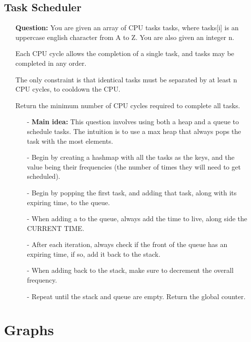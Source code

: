 \documentclass[12pt]{article}
\begin{document}
\subsection{Task Scheduler}
\begin{enumerate}
  \item[] \textbf{Question:} You are given an array of CPU tasks tasks, where tasks[i] is an uppercase english character from A to Z. You are also given an integer n.

Each CPU cycle allows the completion of a single task, and tasks may be completed in any order.

The only constraint is that identical tasks must be separated by at least n CPU cycles, to cooldown the CPU.

Return the minimum number of CPU cycles required to complete all tasks.


    \begin{enumerate}
      \item[-] \textbf{Main idea:} This question involves using both a heap and a queue to schedule tasks. The intuition is to use a max heap that always pops the task with the most elements. 
      \item[-] Begin by creating a hashmap with all the tasks as the keys, and the value being their frequencies (the number of times they will need to get scheduled). 
      \item[-] Begin by popping the first task, and adding that task, along with its expiring time, to the queue. 
      \item[-] When adding a to the queue, always add the time to live, along side the CURRENT TIME. 
      \item[-] After each iteration, always check if the front of the queue has an expiring time, if so, add it back to the stack.
      \item[-] When adding back to the stack, make sure to decrement the overall frequency.
      \item[-] Repeat until the stack and queue are empty. Return the global counter.
    \end{enumerate}
\end{enumerate}



\section{Graphs}
\end{document}
